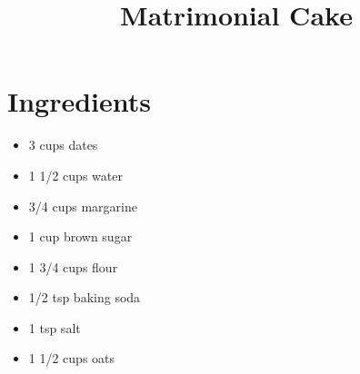 \documentclass[notitlepage,12pt]{report}
\title{Matrimonial Cake}
\date{}
\providecommand{\tightlist}{%
  \setlength{\itemsep}{0pt}\setlength{\parskip}{0pt}}
\begin{document}
\maketitle

\begin{minipage}[t]{0.4\textwidth}\vspace{0pt}

\hypertarget{ingredients}{%
\section*{Ingredients}\label{ingredients}}

\begin{itemize}[leftmargin=*]
\tightlist
\item
  3 cups dates
\item
  1 1/2 cups water
\item
  3/4 cups margarine
\item
  1 cup brown sugar
\item
  1 3/4 cups flour
\item
  1/2 tsp baking soda
\item
  1 tsp salt
\item
  1 1/2 cups oats
\end{itemize}



\end{minipage}%
\hfill
\end{document}
